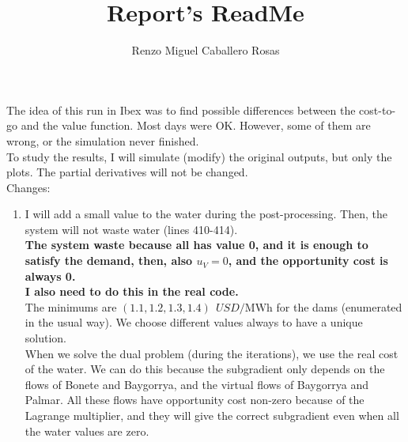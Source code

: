 \documentclass[12pt]{article}
\theoremstyle{definition}
\theoremstyle{remark}
\begin{document}
\title{Report's ReadMe}
\author{Renzo Miguel Caballero Rosas} 
\maketitle

The idea of this run in Ibex was to find possible differences between the cost-to-go and the value function. Most days were OK. However, some of them are wrong, or the simulation never finished.\\
To study the results, I will simulate (modify) the original outputs, but only the plots. The partial derivatives will not be changed.\\
Changes:
\begin{enumerate}

\item I will add a small value to the water during the post-processing. Then, the system will not waste water (lines 410-414).\\
\textbf{The system waste because all has value 0, and it is enough to satisfy the demand, then, also $u_V=0$, and the opportunity cost is always 0.}\\
\textbf{{\color{red} I also need to do this in the real code}.}\\
The minimums are $(1.1,1.2,1.3,1.4)\ \SI{}{USD/\mega\watt\hour}$ for the dams (enumerated in the usual way). We choose different values always to have a unique solution.\\
When we solve the dual problem (during the iterations), we use the real cost of the water. We can do this because the subgradient only depends on the flows of Bonete and Baygorrya, and the virtual flows of Baygorrya and Palmar. All these flows have opportunity cost non-zero because of the Lagrange multiplier, and they will give the correct subgradient even when all the water values are zero.

\end{enumerate}
\end{document}
